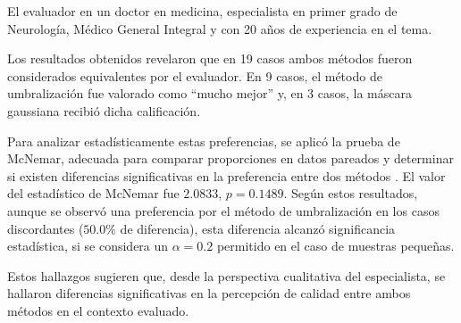 El evaluador en un doctor en medicina, especialista en primer grado de Neurología, Médico General Integral y con 20 años de experiencia en el tema.

Los resultados obtenidos revelaron que en 19 casos ambos métodos fueron considerados equivalentes por el evaluador. En 9 casos, el método de umbralización fue valorado como “mucho mejor” y, en 3 casos, la máscara gaussiana recibió dicha calificación.

Para analizar estadísticamente estas preferencias, se aplicó la prueba de McNemar, adecuada para comparar proporciones en datos pareados y determinar si existen diferencias significativas en la preferencia entre dos métodos \cite{mcnemar}. El valor del estadístico de McNemar fue $2.0833$, $p = 0.1489$. Según estos resultados, aunque se observó una preferencia por el método de umbralización en los casos discordantes ($50.0\%$ de diferencia), esta diferencia alcanzó significancia estadística, si se considera un $\alpha = 0.2$ permitido en el caso de muestras pequeñas.

Estos hallazgos sugieren que, desde la perspectiva cualitativa del especialista, se hallaron diferencias significativas en la percepción de calidad entre ambos métodos en el contexto evaluado.